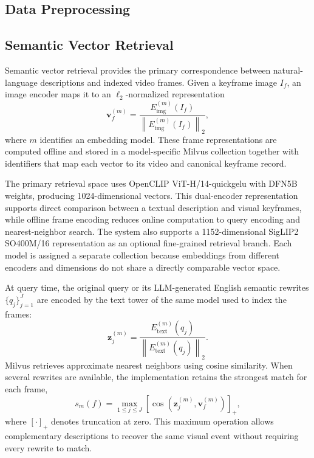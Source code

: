 \documentclass[11pt]{article}
\begin{document}
\subsection{Data Preprocessing}

\subsection{Semantic Vector Retrieval}

Semantic vector retrieval provides the primary correspondence between
natural-language descriptions and indexed video frames. Given a
keyframe image $I_f$, an image encoder maps it to an
$\ell_2$-normalized representation
\begin{equation}
    \mathbf{v}^{(m)}_f =
    \frac{E^{(m)}_{\mathrm{img}}(I_f)}
    {\left\|E^{(m)}_{\mathrm{img}}(I_f)\right\|_2},
\end{equation}
where $m$ identifies an embedding model. These frame representations
are computed offline and stored in a model-specific Milvus collection
together with identifiers that map each vector to its video and
canonical keyframe record.

The primary retrieval space uses OpenCLIP
ViT-H/14-quickgelu with DFN5B weights, producing 1024-dimensional
vectors. This dual-encoder representation supports direct comparison
between a textual description and visual keyframes, while offline
frame encoding reduces online computation to query encoding and
nearest-neighbor search. The system also supports a
1152-dimensional SigLIP2 SO400M/16 representation as an optional
fine-grained retrieval branch. Each model is assigned a separate
collection because embeddings from different encoders and dimensions
do not share a directly comparable vector space.

At query time, the original query or its LLM-generated English
semantic rewrites $\{q_j\}_{j=1}^{J}$ are encoded by the text tower of
the same model used to index the frames:
\begin{equation}
    \mathbf{z}^{(m)}_j =
    \frac{E^{(m)}_{\mathrm{text}}(q_j)}
    {\left\|E^{(m)}_{\mathrm{text}}(q_j)\right\|_2}.
\end{equation}
Milvus retrieves approximate nearest neighbors using cosine
similarity. When several rewrites are available, the implementation
retains the strongest match for each frame,
\begin{equation}
    s_m(f)=
    \max_{1\leq j\leq J}
    \left[\cos\!\left(
    \mathbf{z}^{(m)}_j,\mathbf{v}^{(m)}_f
    \right)\right]_{+},
\end{equation}
where $[\cdot]_{+}$ denotes truncation at zero. This maximum operation
allows complementary descriptions to recover the same visual event
without requiring every rewrite to match.
\end{document}
